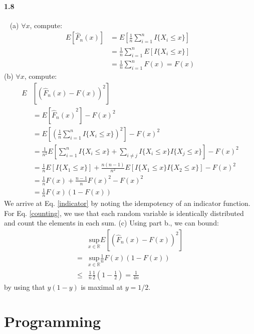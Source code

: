 \documentclass{article}
\begin{document}
\paragraph{1.8}\ \newline
(a) $\forall x$, compute:
\begin{align}
    E[\hat{F}_n(x)]
    &=E[\frac{1}{n}\sum_{i=1}^{n}I\{X_i \le x\}]\\
    &=\frac{1}{n}\sum_{i=1}^{n}E[I\{X_i \le x\}]\\
    &=\frac{1}{n}\sum_{i=1}^{n}F(x)=F(x)
\end{align}
\newline
\newline
(b) $\forall x$, compute:
\begin{align}
    E&[(\hat{F}_n(x)-F(x))^2] \\
    &=E[{\hat{F}_n(x)}^2]-F(x)^2 \\
    &=E[(\frac{1}{n}\sum_{i=1}^{n}I\{X_i \le x\})^2]-F(x)^2 \\
    &=\frac{1}{n^2} E[\sum_{i=1}^{n}I\{X_i \le x\} + \sum_{i\ne j}I\{X_i \le x\}I\{X_j \le x\}]-F(x)^2 \label{indicator} \\
    &=\frac{1}{n} E[I\{X_1 \le x\}] + \frac{n(n-1)}{n^2} E[I\{X_1 \le x\}I\{X_2 \le x\}]-F(x)^2 \label{counting} \\
    &=\frac{1}{n} F(x) + \frac{n-1}{n} F(x)^2 - F(x)^2 \\
    &=\frac{1}{n} F(x)(1-F(x))
\end{align}
We arrive at Eq. \ref{indicator} by noting the idempotency of an indicator function. For Eq. \ref{counting}, we use that each random variable is identically distributed and count the elements in each sum.
\newline
\newline
(c) Using part b., we can bound:
\begin{align}
    &\underset{x \in \mathds{R}}{\text{sup}} E[(\hat{F}_n(x)-F(x))^2] \\
    =&\underset{x \in \mathds{R}}{\text{sup}} \frac{1}{n} F(x)(1-F(x)) \\
    \le& \frac{1}{n}\frac{1}{2}(1-\frac{1}{2}) = \frac{1}{4n} \label{inequality}
\end{align}
by using that $y(1-y)$ is maximal at $y=1/2$.

\section{Programming}
\end{document}
